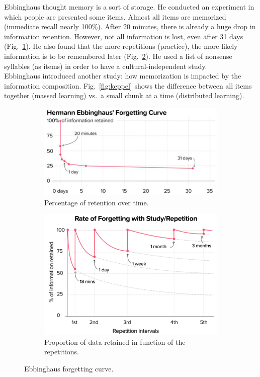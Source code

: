 Ebbinghaus thought memory is a sort of storage.
He conducted an experiment in which people are presented some items. Almost all items are memorized (immediate recall nearly 100\%). After 20 minutes, there is already a huge drop in information retention. However, not all information is lost, even after 31 days (Fig.~\ref{fig:ebbinghaus}). He also found that the more repetitions (practice), the more likely 
information is to be remembered later (Fig.~\ref{fig:ebbinghaus_2}).
He used a list of nonsense syllables (as items) in order to have a cultural-independent study.\\
Ebbinghaus introduced another study: how memorization is impacted by the information composition.
Fig.~\ref{fig:keppel} shows the difference between all items together (massed learning) vs.~a small chunk at a time (distributed learning).

\begin{figure}[!ht]
    \centering
    \captionsetup{width=.8\linewidth}
    \begin{subfigure}{.49\textwidth}
        \centering
        \captionsetup{width=.8\linewidth}
        \includegraphics[width=.9\linewidth]{images/ebbinghaus.png}
        \caption{Percentage of retention over time.}
        \label{fig:ebbinghaus}
    \end{subfigure}
    \begin{subfigure}{.49\textwidth}
        \centering
        \captionsetup{width=.8\linewidth}
        \includegraphics[width=.85\linewidth]{images/ebbinghaus_2.png}
        \caption{Proportion of data retained in function of the repetitions.}
        \label{fig:ebbinghaus_2}
    \end{subfigure}
    \caption{Ebbinghaus forgetting curve.}
    \label{fig:ebbinghaus_1}
\end{figure}

